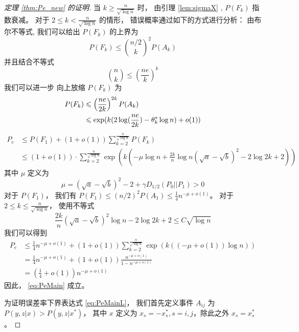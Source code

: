 \begin{proof}[定理 \ref{thm:Pe_new} 的证明]
当 $k \geq \frac{n}{\sqrt{\log n}}$ 时，
由引理 \ref{lem:sigmaX} ,
$P(F_k)$ 指数衰减。
对于 $2\leq k < \frac{n}{\sqrt{\log n}}$
的情形，
错误概率通过如下的方式进行分析：
由布尔不等式,
我们可以给出 $P(F_k)$ 的上界为
\begin{equation}\label{eq:FAk}
P(F_k) \leq \binom{n/2}{k}^2 P(A_k)
\end{equation}
并且结合不等式
\begin{equation}\label{eq:nk_binom_small}
    \binom{n}{k} \leq (\frac{ne}{k})^k
\end{equation}
我们可以进一步 向上放缩 $P(F_k)$ 为
\begin{align}
P(F_k) & \leq \left(\frac{ne}{2k}\right)^{2k} P(A_k) 
\label{eq:P_F_k_less_A_k}\\
&\leq \exp(k(2\log(\frac{ne}{2k})-\theta_k^* \log n) + o(1))
\notag
\end{align}
\begin{align*}
P_e &\leq P(F_1)+(1+o(1))\sum_{k=2}^{\frac{n}{\sqrt{\log n}}} P(F_k) \\
& \leq (1+o(1))\cdot \sum_{k=2}^{\frac{n}{\sqrt{\log n}}}
\exp\left(k(-\mu \log n + \frac{2k}{n} \log n(\sqrt{a} - \sqrt{b})^2 - 2\log 2k + 2)
\right)
\end{align*}
其中 $\mu$ 定义为
\begin{equation}\label{eq:mu_def}
	\mu = (\sqrt{a} - \sqrt{b})^2-2 + \gamma D_{1/2}(P_0||P_1) > 0	
\end{equation}
对于 $P(F_1)$， 我们有 $P(F_1)\leq (n/2)^2
P(A_1)\leq \frac{1}{4}n^{-\mu+o(1)}$。
对于 $2\leq k \leq \frac{n}{\sqrt{\log n}}$，
使用不等式
$$
\frac{2k}{n}(\sqrt{a} - \sqrt{b})^2\log n -2\log2k+2\leq  C\sqrt{\log n}
$$
我们可以得到
\begin{align*}
P_e &\leq \frac{1}{4}n^{-\mu + o(1)} +(1+o(1)) \sum_{k=2}^{\frac{n}{\sqrt{\log n}}} \exp(k((-\mu + o(1)) \log n )) \\
& =\frac{1}{4}n^{-\mu + o(1)}+(1+o(1)) \frac{n^{-\mu + o(1)}}{1-n^{-\mu + o(1)}} \\
&= (\frac{1}{4}+o(1))n^{-\mu + o(1)}
\end{align*}
因此， \eqref{eq:PeMain} 成立。

为证明误差率下界表达式
\eqref{eq:PeMainL}，
我们首先定义事件 $A_{ij}$ 为
$P(y,z|x) > P(y,z|x^*)$，
其中 $x$ 定义为
$x_s=-x^*_s,
s=i,j$，除此之外
$x_s=x^*_s$
。


\end{proof}
